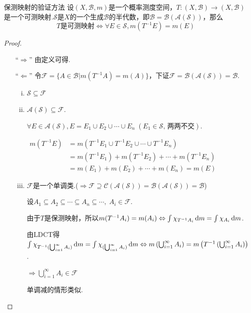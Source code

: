\begin{theorem}{保测映射的验证方法}
    设$(X,\mathcal{B},m)$是一个概率测度空间，$T:(X,\mathcal{B}) \to (X,\mathcal{B})$是一个可测映射.$\mathcal{S}$是$X$的一个生成$\mathcal{B}$的半代数，即$\mathcal{B}=\mathcal{B}(\mathcal{A}(\mathcal{S}))$，那么
    \[ T\text{是可测映射} \Longleftrightarrow \forall E \in \mathcal{S},m(T^{-1}E) = m(E) \]
\end{theorem}
\begin{proof}
    \begin{itemize}[leftmargin = 3.5em]
        \item[“$\Rightarrow$”] 由定义可得.
        \item[“$\Leftarrow$”] 令$\mathcal{F} = \{A\in\mathcal{B}|m(T^{-1}A)=m(A)\}$，下证$\mathcal{F}=\mathcal{B}(\mathcal{A}(\mathcal{S}))=\mathcal{B}$.\par
        \begin{enumerate}[(i)]
            \item $\mathcal{S}\subseteq\mathcal{F}$
            \item $\mathcal{A}(\mathcal{S})\subseteq\mathcal{F}$.\par
            $\forall E\in\mathcal{A}(\mathcal{S}),E=E_1\cup E_2\cup\cdots\cup E_n \;(E_1\in\mathcal{S},\,\text{两两不交})$.\par
            $\begin{aligned}
                m(T^{-1}E) &= m(T^{-1}E_1\cup T^{-1}E_2\cup\cdots\cup T^{-1}E_n)\\
                &=m(T^{-1}E_1)+m(T^{-1}E_2)+\cdots+m(T^{-1}E_n)\\
                &=m(E_1)+m(E_2)+\cdots+m(E_n)=m(E)
            \end{aligned}$\par
            \item $\mathcal{F}$是一个单调类.($\Rightarrow \mathcal{F}\supseteq\mathcal{C}(\mathcal{A}(\mathcal{S}))=\mathcal{B}(\mathcal{A}(\mathcal{S}))=\mathcal{B}$)\par
            设$A_1\subseteq A_2\subseteq \cdots\subseteq A_n\subseteq\cdots,\;A_i\in\mathcal{F}$.\par
            由于$T$是保测映射，所以$m(T^{-1}A_i)=m(A_i) \Leftrightarrow \int{\chi_{T^{-1}A_i}}\mathop{}\!\mathrm{d} m=\int {\chi_{A_i}}\mathop{}\!\mathrm{d} m$.\par
            由LDCT得$\int{\chi_{T^{-1}(\bigcup_{i=1}^\infty{A_i})}}\mathop{}\!\mathrm{d} m=\int{\chi_{(\bigcup_{i=1}^\infty{A_i})}}\mathop{}\!\mathrm{d} m \Leftrightarrow m\left(\bigcup_{i=1}^\infty{A_i}\right) = m\left(T^{-1}\left(\bigcup_{i=1}^\infty{A_i}\right)\right)$.\par
            $\Rightarrow \bigcup_{i=1}^\infty{A_i}\in\mathcal{F}$\par
            单调减的情形类似.
        \end{enumerate}
    \end{itemize}
\end{proof}

